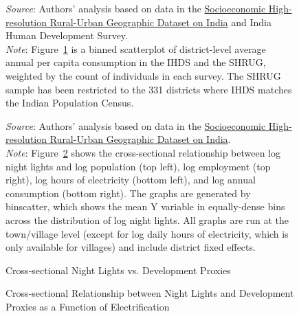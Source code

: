 \documentclass[12pt,letterpaper]{article}
\newcommand{\shrugpath}{.}
\begin{document}
\begin{appendix}
\begin{figure}[H]
\begin{adjustwidth}{2cm}{2cm}
\footnotesize{\textit{Source}: Authors' analysis based on data in the
  \href{http://www.devdatalab.org/shrug}{Socioeconomic High-resolution
    Rural-Urban Geographic Dataset on India} and India Human
  Development Survey. \\ \textit{Note}: Figure~\ref{fig:ihds_shrug_cons_binscatter} is a binned
  scatterplot of district-level average annual per capita consumption in the
  IHDS and the SHRUG, weighted by the count of individuals in each
  survey. The SHRUG sample has been restricted to the 331 districts where
  IHDS matches the Indian Population Census.}
\end{adjustwidth}

\label{fig:ihds_shrug_cons_binscatter}
\end{figure}

\newpage
\begin{figure}[H]\caption{Cross-sectional Night Lights vs. Development Proxies}
  \begin{center}
  \end{center}

\begin{adjustwidth}{2cm}{2cm}
  \footnotesize{\textit{Source}: Authors' analysis based on data in the
  \href{http://www.devdatalab.org/shrug}{Socioeconomic High-resolution
    Rural-Urban Geographic Dataset on India}. \\ \textit{Note}: Figure~\ref{fig:nl_xvars} shows the cross-sectional
    relationship between log night lights and log population (top
    left), log employment (top right), log hours of electricity
    (bottom left), and log annual consumption (bottom right). The
    graphs are generated by binscatter, which shows the mean Y
    variable in equally-dense bins across the distribution of log
    night lights. All graphs are run at the town/village level (except
    for log daily hours of electricity, which is only available for
    villages) and include district fixed effects.}
\end{adjustwidth}

\label{fig:nl_xvars}
\end{figure}

\begin{figure}[H]\caption{Cross-sectional Relationship between Night Lights and Development Proxies \cnewline as a Function of Electrification}
  \begin{center}
  \end{center}
  

\end{figure}
\end{appendix}
\end{document}
